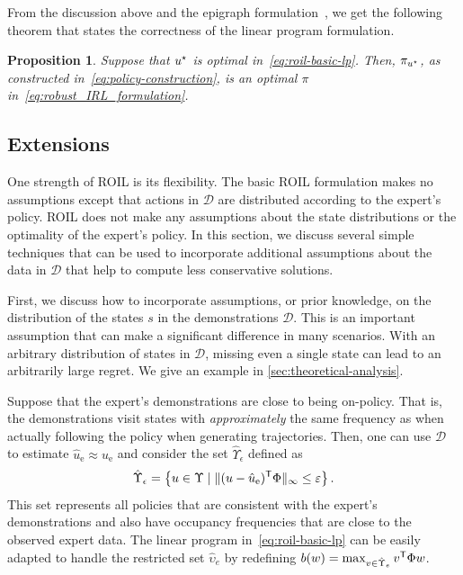 \documentclass[10pt]{article}
\renewcommand{\cite}{\citep}
\theoremstyle{plain}
\newtheorem{proposition}{Proposition}
\theoremstyle{remark}
\begin{document}
From the discussion above and the epigraph formulation~\cite{Boyd_Convex_Optimization}, we get the following theorem that states the correctness of the linear program formulation.
\begin{proposition}
    \label{thm:roil_lp}
    Suppose that $u^{\mathnormal{\star}}$ is optimal in~\eqref{eq:roil-basic-lp}. Then, $\pi_{u^{\mathnormal{\star}}}$, as constructed in~\eqref{eq:policy-construction}, is an optimal $\pi$ in~\eqref{eq:robust_IRL_formulation}.
    \end{proposition}



\subsection{Extensions}
\label{sec:incorp-addit-constr}

One strength of ROIL is its flexibility. The basic ROIL formulation makes no assumptions except that actions in $\mathcal{D}$ are distributed according to the expert's policy. ROIL does not make any assumptions about the state distributions or the optimality of the expert's policy. In this section, we discuss several simple techniques that can be used to incorporate additional assumptions about the data in $\mathcal{D}$ that help to compute less conservative solutions. 

First, we discuss how to incorporate assumptions, or prior knowledge, on the distribution of the states $s$ in the demonstrations $\mathcal{D}$. This is an important assumption that can make a significant difference in many scenarios. With an arbitrary distribution of states in $\mathcal{D}$, missing even a single state can lead to an arbitrarily large regret. We give an example in \cref{sec:theoretical-analysis}.

Suppose that the expert's demonstrations are close to being on-policy. That is, the demonstrations visit states with \emph{approximately} the same frequency as when actually following the policy when generating trajectories. Then, one can use $\mathcal{D}$ to estimate $\hat{u}_{\mathrm{e}} \approx u_{\mathrm{e}}$ and consider the set $\hat{\Upsilon}_{\epsilon}$ defined as
%
\begin{equation}
\label{linf_constraint}
	\hat{\Upsilon}_{\epsilon} = \left\{ u \in \Upsilon \mid  
 \| (u - \hat{u}_{\mathrm{e}})^{\mathsf{T}} \Phi \|_{\infty} \le \varepsilon 
 \right\}.
\end{equation}
This set represents all policies that are consistent with the expert's demonstrations and also have occupancy frequencies that are close to the observed expert data. The linear program in~\eqref{eq:roil-basic-lp} can be easily adapted to handle the restricted set $\hat{\upsilon}_e$ by redefining $b(w) = \max_{v \in \hat{\Upsilon}_e} v^{\mathsf{T}} \Phi  w$. 
\end{document}
